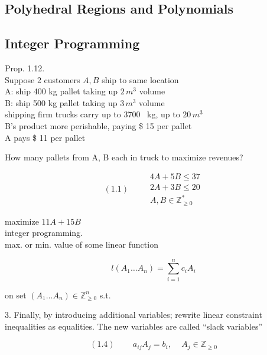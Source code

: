 \documentclass[10pt]{amsart}
\begin{document}
\begin{multicols*}{2}
\section{ Polyhedral Regions and Polynomials }

\subsection{ Integer Programming }

Prop. 1.12. \\

Suppose 2 customers $A, B$ ship to same location \\
\quad A: ship 400 kg pallet taking up $2 \, m^3$ volume \\
\quad B: ship 500 kg pallet taking up $3 \, m^3$ volume \\

shipping firm trucks carry up to 3700 \, kg, up to $20 \, m^3$ \\

B's product more perishable, paying \$ 15 per pallet \\

A pays \$ 11 per pallet

How many pallets from A, B each in truck to maximize revenues?

\begin{equation}
(1.1) \quad \quad \, \begin{gathered}
    4A + 5B \leq 37 \\
    2A  + 3B \leq 20 \\
    A, B \in \mathbb{Z}^*_{ \geq 0 } \end{gathered}
\end{equation}

maximize $11 A + 15 B$ \\

integer programming. \\
max. or min. value of some linear function 

\[
l(A_1 \dots A_n) = \sum_{i=1}^n c_i A_i 
\]

on set $(A_1 \dots A_n) \in \mathbb{Z}^n_{ \geq 0}$ s.t. 


3. Finally, by introducing additional variables; rewrite linear constraint inequalities as equalities. The new variables are called ``slack variables''

\begin{equation}
(1.4) \quad \quad \, a_{ij} A_j = b_i, \quad \, A_j \in \mathbb{Z}_{\geq 0}
\end{equation}


\end{multicols*}
\end{document}
